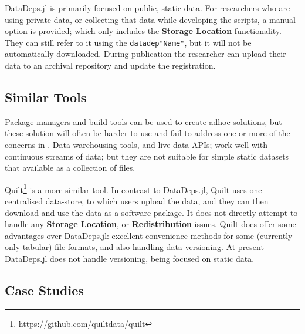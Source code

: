 \documentclass[twoside,11pt]{article}
\newcommand{\datadep}[1]{\texttt{datadep"{}#1"{}}}
\begin{document}
\noindent DataDeps.jl is primarily focused on public, static data.
For researchers who are using private data, or collecting that data while developing the scripts, a manual option is provided; which only includes the \textbf{Storage Location} functionality. They can still refer to it using the \datadep{Name}, but it will not be automatically downloaded.
During publication the researcher can upload their data to an archival repository and update the registration.



\subsection{Similar Tools}
Package managers and build tools can be used to create adhoc solutions, but these solution will often be harder to use and fail to address one or more of the concerns in .
Data warehousing tools, and live data APIs; work well with continuous streams of data;
but they are not suitable for simple static datasets that available as a collection of files.


Quilt\footnote{\url{https://github.com/quiltdata/quilt}} is a more similar tool.
In contrast to DataDeps.jl, Quilt uses one centralised data-store, to which users upload the data, and they can then download and use the data as a software package.
It does not directly attempt to handle any \textbf{Storage Location}, or \textbf{Redistribution} issues.
%
Quilt does offer some advantages over DataDeps.jl:
excellent convenience methods for some (currently only tabular) file formats, 
and also handling data versioning.
At present DataDeps.jl does not handle versioning, being focused on static data.


\subsection{Case Studies}\label{sec:case-studies}
\end{document}
